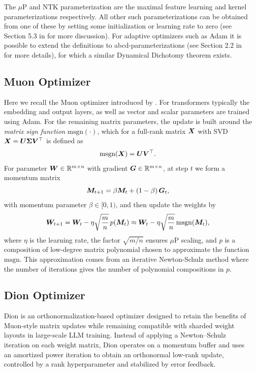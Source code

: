  The $\mu$P and NTK parameterization are the maximal feature learning and kernel parameterizations respectively. All other such parameterizations can be obtained from one of these by setting some initialization or learning rate to zero (see Section 5.3 in \citep{yang2021tensor} for more discussion). For adaptive optimizers such as Adam it is possible to extend the definitions to abcd-parameterizations (see Section 2.2 in \citep{yang2023tensor} for more details), for which a similar Dynamical Dichotomy theorem exists.

\subsection{Muon Optimizer}\label{app:muon}
Here we recall the Muon optimizer introduced by \citet{jordan2024muon}. For transformers typically the embedding and output layers, as well as vector and scalar parameters are trained using Adam. For the remaining matrix parameters, the update is built around the \emph{matrix sign function} $\mathrm{msgn}(\cdot)$, which for a full-rank matrix ${\boldsymbol X}$ with SVD ${\boldsymbol X} = {\boldsymbol U} {\boldsymbol \Sigma} {\boldsymbol V}^\top$ is defined as
\[
  \mathrm{msgn}({\boldsymbol X}) = {\boldsymbol U} {\boldsymbol V}^\top.
\]
For parameter ${\boldsymbol W} \in \mathbb{R}^{m \times n}$ with gradient ${\boldsymbol G} \in \mathbb{R}^{m \times n}$, at step $t$ we form a momentum matrix
\[
  {\boldsymbol M}_{t+1} = \beta {\boldsymbol M}_t + (1 - \beta)\, {\boldsymbol G}_t,
\]
with momentum parameter $\beta \in [0,1)$, and then update the weights by
\[
  {\boldsymbol W}_{t+1} = {\boldsymbol W}_t - \eta \sqrt{\frac{m}{n}}\, p({\boldsymbol M}_{t}) \approx {\boldsymbol W}_t - \eta \sqrt{\frac{m}{n}}\, \mathrm{msgn}({\boldsymbol M}_{t}),
\]
where $\eta$ is the learning rate, the factor $\sqrt{m/n}$ ensures $\mu$P scaling, and $p$ is a composition of low-degree matrix polynomial chosen to approximate the function $\mathrm{msgn}$. This approximation comes from an iterative Newton-Schulz method where the number of iterations gives the number of polynomial compositions in $p$. 

\subsection{Dion Optimizer}\label{app:dion}
Dion \citep{ahn2025dion} is an orthonormalization-based optimizer designed to retain the benefits of Muon-style matrix updates while remaining compatible with sharded weight layouts in large-scale LLM training. Instead of applying a Newton--Schulz iteration on each weight matrix, Dion operates on a momentum buffer and uses an amortized power iteration to obtain an orthonormal low-rank update, controlled by a rank hyperparameter and stabilized by error feedback.

